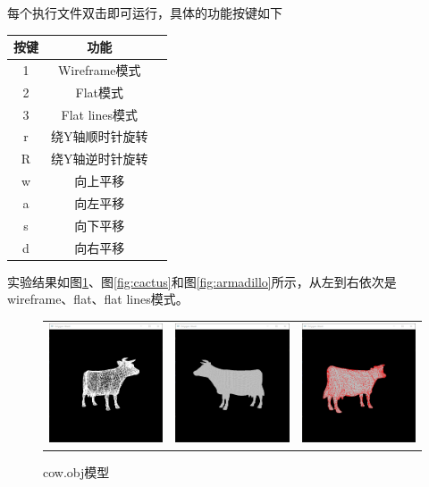 \documentclass[logo,reportComp]{thesis}
\begin{document}
每个执行文件双击即可运行，具体的功能按键如下
\begin{center}
\begin{tabular}{|c|c|c|}\hline
按键 & 功能\\\hline
1 & Wireframe模式\\\hline
2 & Flat模式\\\hline
3 & Flat lines模式\\\hline
r & 绕Y轴顺时针旋转\\\hline
R & 绕Y轴逆时针旋转\\\hline
w & 向上平移\\\hline
a & 向左平移\\\hline
s & 向下平移\\\hline
d & 向右平移\\\hline
\end{tabular}
\end{center}

实验结果如图\ref{fig:cow}、图\ref{fig:cactus}和图\ref{fig:armadillo}所示，从左到右依次是wireframe、flat、flat lines模式。
\begin{figure}[H]
\centering
\begin{tabular}{ccc}
\includegraphics[width=0.33\linewidth]{fig/cow1.png} &
\includegraphics[width=0.33\linewidth]{fig/cow2.png} &
\includegraphics[width=0.33\linewidth]{fig/cow3.png}
\end{tabular}
\caption{cow.obj模型}
\label{fig:cow}
\end{figure}
\end{document}
